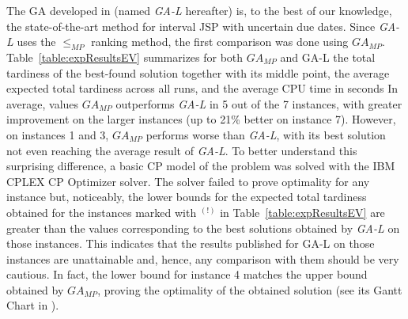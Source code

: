 \documentclass[12pt,halfline,a4paper]{ouparticle}
\begin{document}
The GA developed in \cite{Lei2012c} (named \textit{GA-L} hereafter) is, to the best of our knowledge, the state-of-the-art method for interval JSP with uncertain due dates. Since \textit{GA-L} uses the $\leq_{MP}$ ranking method, the first comparison was done using $GA_{MP}$.  Table~\ref{table:expResultsEV} summarizes for both $GA_{MP}$ and GA-L the total tardiness of the best-found solution together with its middle point, the average expected total tardiness across all runs, and the average CPU time in seconds In average, values $GA_{MP}$ outperforms \textit{GA-L} in 5 out of the 7 instances, with greater improvement on the larger instances (up to 21\% better on instance 7).  However, on instances 1 and 3, $GA_{MP}$ performs worse than \textit{GA-L}, with its best solution not even reaching the average result of \textit{GA-L}. To better understand this surprising difference, a basic CP model of the problem was solved with the IBM CPLEX CP Optimizer solver. The solver failed to prove optimality for any instance but, noticeably, the lower bounds for the expected total tardiness obtained for the instances marked with $^{(!)}$ in Table~\ref{table:expResultsEV} are greater than the values corresponding to the best solutions obtained by \textit{GA-L} on those instances. This indicates that the results published for GA-L on those instances are unattainable and, hence, any comparison with them should be very cautious. In fact, the lower bound for instance 4 matches the upper bound obtained by $GA_{MP}$, proving the optimality of the obtained solution (see its Gantt Chart in \cite{Diaz2020}). 
\end{document}
